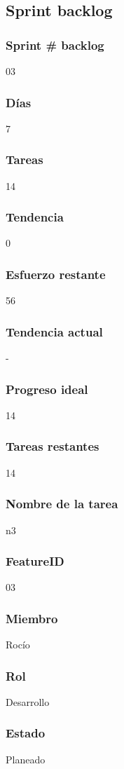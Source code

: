 \subsection{Sprint backlog}
\subsubsection{Sprint # backlog}
03
\subsubsection{Días}
7
\subsubsection{Tareas}
14
\subsubsection{Tendencia}
0
\subsubsection{Esfuerzo restante}
56
\subsubsection{Tendencia actual}
-
\subsubsection{Progreso ideal}
14
\subsubsection{Tareas restantes}
14
\subsubsection{Nombre de la tarea}
n3
\subsubsection{FeatureID}
03
\subsubsection{Miembro}
Rocío
\subsubsection{Rol}
Desarrollo
\subsubsection{Estado}
Planeado
